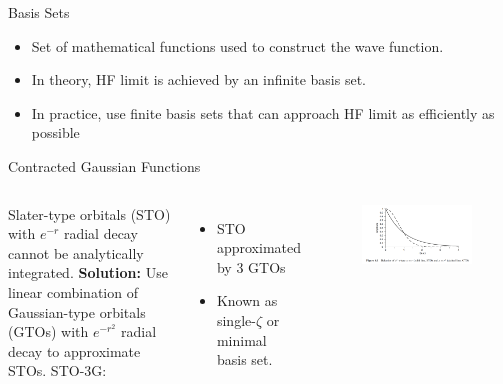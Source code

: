 \documentclass[aspectratio=169]{beamer}
\begin{document}
\begin{frame}{Basis Sets}

\begin{itemize}
    \item Set of mathematical functions used to construct the wave function.
    \item In theory, HF limit is achieved by an infinite basis set.
    \item In practice, use finite basis sets that can approach HF limit as efficiently as possible
\end{itemize}

\end{frame}


\begin{frame}{Contracted Gaussian Functions}

\begin{columns}
Slater-type orbitals (STO) with $e^{-r}$ radial decay cannot be analytically integrated.\newline
\newline
\textbf{Solution: }Use linear combination of Gaussian-type orbitals (GTOs) with $e^{-r^2}$ radial decay to approximate STOs.\newline
\newline
STO-3G:
\begin{itemize}
\item STO approximated by 3 GTOs
\item Known as single-$\zeta$ or minimal basis set. 
\end{itemize}

    \begin{figure}
        \centering
        \includegraphics[width=\linewidth]{lectures/figures/2_STO.png}
    \end{figure}
\end{columns}

\end{frame}
\end{document}
